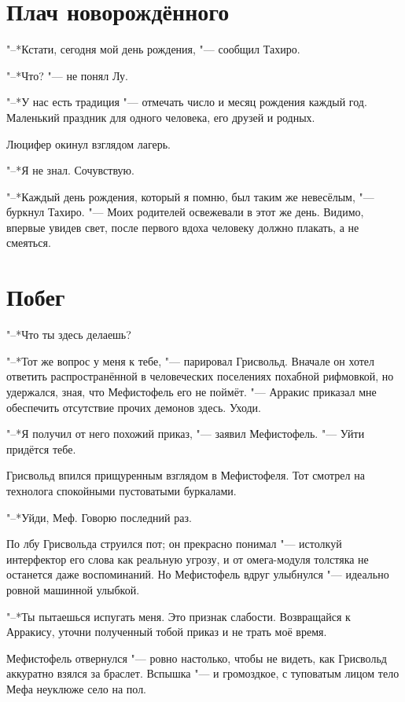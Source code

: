 \documentclass[a4paper,10pt,fleqn]{book}
\begin{document}
\section{Плач новорождённого}

"--*Кстати, сегодня мой день рождения, "--- сообщил Тахиро.

"--*Что? "--- не понял Лу.

"--*У нас есть традиция "--- отмечать число и месяц рождения каждый год.
Маленький праздник для одного человека, его друзей и родных.

Люцифер окинул взглядом лагерь.

"--*Я не знал.
Сочувствую.

"--*Каждый день рождения, который я помню, был таким же невесёлым, "--- буркнул Тахиро.
"--- Моих родителей освежевали в этот же день.
Видимо, впервые увидев свет, после первого вдоха человеку должно плакать, а не смеяться.

\section{Побег}

"--*Что ты здесь делаешь?

"--*Тот же вопрос у меня к тебе, "--- парировал Грисвольд.
Вначале он хотел ответить распространённой в человеческих поселениях похабной рифмовкой, но удержался, зная, что Мефистофель его не поймёт.
"--- Арракис приказал мне обеспечить отсутствие прочих демонов здесь.
Уходи.

"--*Я получил от него похожий приказ, "--- заявил Мефистофель.
"--- Уйти придётся тебе.

Грисвольд впился прищуренным взглядом в Мефистофеля.
Тот смотрел на технолога спокойными пустоватыми буркалами.

"--*Уйди, Меф.
Говорю последний раз.

По лбу Грисвольда струился пот; он прекрасно понимал "--- истолкуй интерфектор его слова как реальную угрозу, и от омега-модуля толстяка не останется даже воспоминаний.
Но Мефистофель вдруг улыбнулся "--- идеально ровной машинной улыбкой.

"--*Ты пытаешься испугать меня.
Это признак слабости.
Возвращайся к Арракису, уточни полученный тобой приказ и не трать моё время.

Мефистофель отвернулся "--- ровно настолько, чтобы не видеть, как Грисвольд аккуратно взялся за браслет.
Вспышка "--- и громоздкое, с туповатым лицом тело Мефа неуклюже село на пол.
\end{document}
